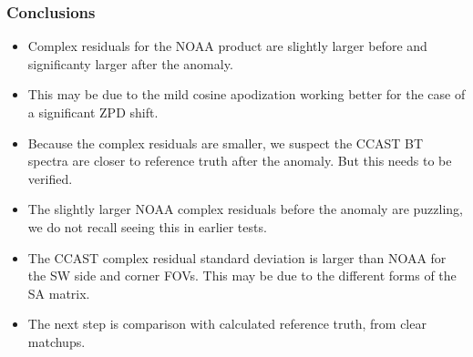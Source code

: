 \documentclass[10pt]{beamer}
\begin{document}
\begin{frame}
\begin{columns}[t]
\begin{column}{0.5\textwidth}
\end{column}
\end{columns}
\end{frame}
\begin{frame}
\frametitle{Conclusions}
\begin{itemize}

  \item Complex residuals for the NOAA product are slightly larger
    before and significanty larger after the anomaly.

  \item This may be due to the mild cosine apodization working
    better for the case of a significant ZPD shift.

  \item Because the complex residuals are smaller, we suspect
    the CCAST BT spectra are closer to reference truth after the
    anomaly.  But this needs to be verified.

  \item The slightly larger NOAA complex residuals before the
    anomaly are puzzling, we do not recall seeing this in earlier
    tests.

  \item The CCAST complex residual standard deviation is larger
    than NOAA for the SW side and corner FOVs.  This may be due to
    the different forms of the SA matrix.

  \item The next step is comparison with calculated reference truth,
    from clear matchups.

\end{itemize}
\end{frame}
\end{document}
